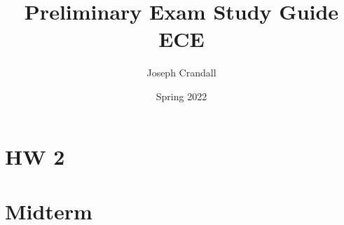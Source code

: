 
\usepackage{algorithm, algpseudocode, color, gensymb, siunitx, soul, subfiles}

\title{Preliminary Exam Study Guide\\
\large ECE }
\author{Joseph Crandall}
\date{Spring 2022}


\maketitle

%

\section{HW 2}


\section{Midterm}


%

%

%

%

%


